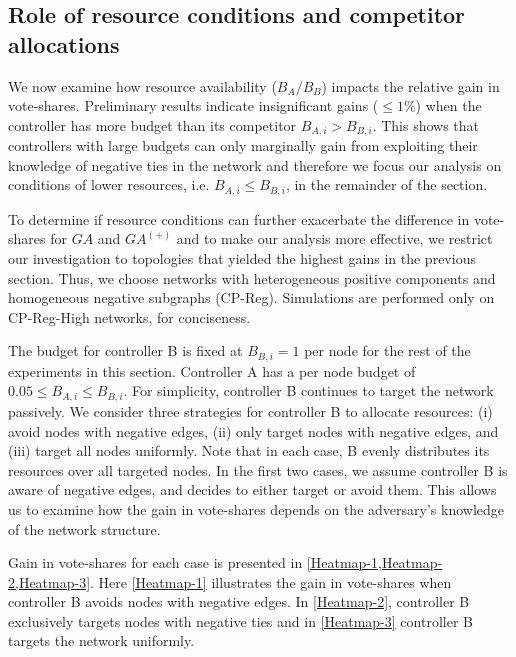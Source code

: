 

\subsection{Role of resource conditions and competitor allocations}
\label{resources}
We now examine how resource availability ($B_{A}/B_{B}$) impacts the relative gain in vote-shares. 
Preliminary results indicate insignificant gains ($\leq1\%$) when the controller has more budget than its competitor $B_{A,i} > B_{B,i}$. This shows that controllers with large budgets can only marginally gain from exploiting their knowledge of negative ties in the network and therefore we focus our analysis on conditions of lower resources, i.e. $B_{A,i} \leq B_{B,i}$, in the remainder of the section.

To determine if resource conditions can further exacerbate the difference in vote-shares for $GA$ and $GA^{(+)}$ and to make our analysis more effective, we restrict our investigation to topologies that yielded the highest gains in the previous section. Thus, we choose networks with heterogeneous positive components and homogeneous negative subgraphs (CP-Reg). Simulations are performed only on CP-Reg-High networks, for conciseness.  

The budget for controller B is fixed at $B_{B,i} = 1$ per node for the rest of the experiments in this section. Controller A has a per node budget of $0.05 \leq B_{A,i} \leq B_{B,i}$.
For simplicity, controller B continues to target the network passively. We consider three strategies for controller B to allocate resources: (i) avoid nodes with negative edges, (ii) only target nodes with negative edges, and (iii) target all nodes uniformly. Note that in each case, B evenly distributes its resources over all targeted nodes. In the first two cases, we assume controller B is aware of negative edges, and decides to either target or avoid them. This allows us to examine how the gain in vote-shares depends on the adversary's knowledge of the network structure.


Gain in vote-shares for each case is presented in \cref{Heatmap-1,Heatmap-2,Heatmap-3}. Here \cref{Heatmap-1} illustrates the gain in vote-shares when controller B avoids nodes with negative edges. In \cref{Heatmap-2}, controller B exclusively targets nodes with negative ties and in \cref{Heatmap-3} controller B targets the network uniformly.

